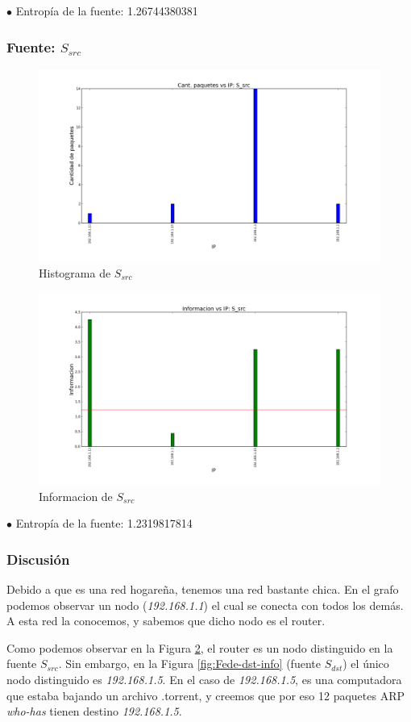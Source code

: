 $\bullet$ Entropía de la fuente: 1.26744380381

\subsubsection{Fuente: $S_{src}$}

\begin{figure}[H]\centering
    \includegraphics[width=0.8\linewidth]{../imgs/red-hogarena_S_src_hist.png}
    \caption{Histograma de $S_{src}$}\label{fig:Fede-src-hist}
\end{figure}

\begin{figure}[H]\centering
    \includegraphics[width=0.8\linewidth]{../imgs/red-hogarena_S_src_info.png}
    \caption{Informacion de $S_{src}$}\label{fig:Fede-src-info}
\end{figure}

$\bullet$ Entropía de la fuente: 1.2319817814

\subsubsection{Discusión}

Debido a que es una red hogareña, tenemos una red bastante chica. En el grafo podemos observar un nodo (\emph{192.168.1.1}) el cual se conecta con todos los demás. A esta red la conocemos, y sabemos que dicho nodo es el router.

Como podemos observar en la Figura \ref{fig:Fede-src-info}, el router es un nodo distinguido en la fuente $S_{src}$. Sin embargo, en la Figura \ref{fig:Fede-dst-info} (fuente $S_{dst}$) el único nodo distinguido es \emph{192.168.1.5}. En el caso de \emph{192.168.1.5}, es una computadora que estaba bajando un archivo .torrent, y creemos que por eso 12 paquetes ARP \emph{who-has} tienen destino \emph{192.168.1.5}.